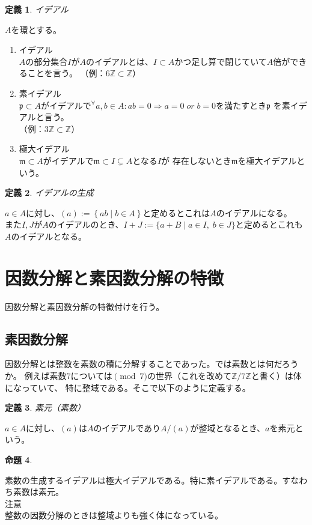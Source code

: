 \documentclass{jsarticle}
\newtheorem{definition}{定義}
\newtheorem{prop}[definition]{命題}
\begin{document}
\begin{definition}
    イデアル
\end{definition}
$A$を環とする。
\begin{enumerate}
    \item イデアル\\$A$の部分集合$I$が$A$のイデアルとは、$I\subset{A}$かつ足し算で閉じていて$A$倍ができることを言う。
    （例：$6\mathbb{Z} \subset \mathbb{Z}$）\\
    \item 素イデアル\\
    $\mathfrak{p}\subset{A}$がイデアルで${}^\forall a,b\in{A}: ab=0 \Rightarrow a=0\; or\; b=0$を満たすとき$\mathfrak{p}$
    を素イデアルと言う。\\
    （例：$3\mathbb{Z}\subset \mathbb{Z}$）\\
    \item 極大イデアル\\
    $\mathfrak{m}\subset{A}$がイデアルで$\mathfrak{m}\subset I\subsetneq A$となる$I$が
    存在しないとき$\mathfrak{m}$を極大イデアルという。
\end{enumerate}
\begin{definition}
    イデアルの生成
\end{definition}
$a\in A$に対し、$(a):=\left\{ ab\mid b\in A \right\}$と定めるとこれは$A$のイデアルになる。\\
また$I,J$が$A$のイデアルのとき、$I+J:=\{ a+B\mid a\in I,\; b\in J\}$と定めるとこれも$A$のイデアルとなる。
%
%
\section{因数分解と素因数分解の特徴}
因数分解と素因数分解の特徴付けを行う。
\subsection{素因数分解}
因数分解とは整数を素数の積に分解することであった。では素数とは何だろうか。
例えば素数$7$については$\pmod 7$の世界（これを改めて$\mathbb{Z}/7\mathbb{Z}$と書く）は体になっていて、
特に整域である。そこで以下のように定義する。
\begin{definition}
    素元（素数）
\end{definition}
$a\in A$に対し、$(a)$は$A$のイデアルであり$A/(a)$が整域となるとき、$a$を素元という。
\begin{prop}
    
\end{prop}
素数の生成するイデアルは極大イデアルである。特に素イデアルである。すなわち素数は素元。
\\
注意\\
整数の因数分解のときは整域よりも強く体になっている。
\end{document}
